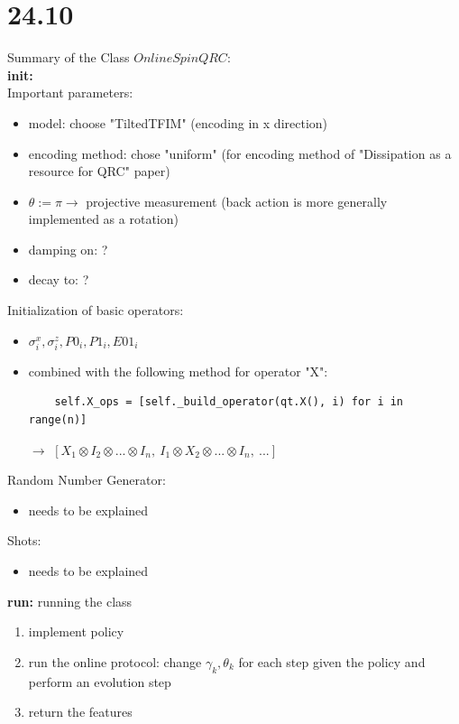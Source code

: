 \section*{24.10}
Summary of the Class $OnlineSpinQRC$:\\

\textbf{init:}\\
Important parameters:
\begin{itemize}
    \item model: choose "TiltedTFIM" (encoding in x direction)
    \item encoding method: chose "uniform" (for encoding method of "Dissipation as a resource for QRC" paper)
    \item $\theta := \pi \to$ projective measurement (back action is more generally implemented as a rotation)
    \item damping on: ?
    \item decay to: ? 
\end{itemize}

Initialization of basic operators:
\begin{itemize}
    \item $\sigma_i^x, \sigma_i^z, P0_i, P1_i, E01_i $
    \item combined with the following method for operator "X": \\
    \begin{lstlisting}
    self.X_ops = [self._build_operator(qt.X(), i) for i in range(n)]
    \end{lstlisting}
    $\to$ $[X_1 \otimes I_2 \otimes ... \otimes I_n, \ I_1 \otimes X_2 \otimes ... \otimes I_n, \ ... ]$
\end{itemize}

Random Number Generator:
\begin{itemize}
    \item needs to be explained
\end{itemize}

Shots:
\begin{itemize}
    \item needs to be explained
\end{itemize}

\textbf{run:}
running the class
\begin{enumerate}
    \item implement policy
    \item run the online protocol: change $\gamma_k, \theta_k$ for each step given the policy and perform an evolution step
    \item return the features
\end{enumerate}

